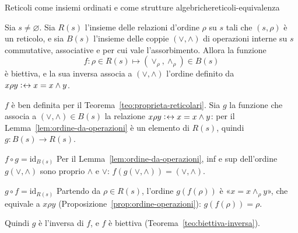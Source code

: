 \begin{concetto}
\begin{Teorema}{Reticoli come insiemi ordinati e come strutture algebriche}{reticoli-equivalenza}
    \begin{prerequisiti}
    \end{prerequisiti}
    Sia $s \neq \varnothing$. Sia $R(s)$ l'insieme delle relazioni d'ordine $\rho$ su $s$ tali che $(s, \rho)$ è un reticolo, e sia $B(s)$ l'insieme delle coppie
    $(\vee, \wedge)$ di operazioni interne su $s$ commutative, associative e per cui vale l'assorbimento. Allora la funzione
    \[ f \colon \rho \in R(s) \mapsto (\vee_\rho, \wedge_\rho) \in B(s) \]
    è biettiva, e la sua inversa associa a $(\vee, \wedge)$ l'ordine definito da $x \rho y \mathrel{\vcentcolon\mkern1mu\leftrightarrow} x = x \wedge y$.
\end{Teorema}
\begin{dimostrazione}
    $f$ è ben definita per il Teorema~\ref{teo:proprieta-reticolari}. Sia $g$ la funzione che associa a $(\vee, \wedge) \in B(s)$ la relazione $x \rho y \mathrel{\vcentcolon\mkern1mu\leftrightarrow} x = x \wedge y$:
    per il Lemma~\ref{lem:ordine-da-operazioni} è un elemento di $R(s)$, quindi $g \colon B(s) \to R(s)$.
    \begin{caso}{$f \circ g = \mathrm{id}_{B(s)}$}
        Per il Lemma~\ref{lem:ordine-da-operazioni}, inf e sup dell'ordine $g(\vee, \wedge)$ sono proprio $\wedge$ e $\vee$: $f(g(\vee, \wedge)) = (\vee, \wedge)$.
    \end{caso}
    \begin{caso}{$g \circ f = \mathrm{id}_{R(s)}$}
        Partendo da $\rho \in R(s)$, l'ordine $g(f(\rho))$ è «$x = x \wedge_\rho y$», che equivale a $x \rho y$ (Proposizione~\ref{prop:ordine-operazioni}): $g(f(\rho)) = \rho$.
    \end{caso}
    Quindi $g$ è l'inversa di $f$, e $f$ è biettiva (Teorema~\ref{teo:biettiva-inversa}).
\end{dimostrazione}
\end{concetto}

